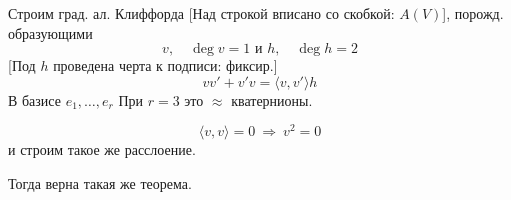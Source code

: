 Строим град. ал. Клиффорда [Над строкой вписано со скобкой: $A(V)$],
порожд. образующими
\begin{equation*}
v,\quad\operatorname{deg}v=1\text{ и }h,\quad\operatorname{deg}h=2
\end{equation*}
[Под $h$ проведена черта к подписи: фиксир.]
\begin{equation*}
vv'+v'v=\langle v,v'\rangle h
\end{equation*}
В 
базисе $e_1,\ldots,e_r$
При $r=3$ это $\approx$ кватернионы.

\begin{equation*}
\langle v,v\rangle=0\ \Rightarrow\ v^2=0
\end{equation*}
и строим такое же расслоение.

Тогда верна такая же теорема.

